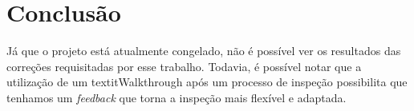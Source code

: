 \chapter{Conclusão}

Já que o projeto está atualmente congelado, não é possível ver os resultados das
correções requisitadas por esse trabalho. Todavia, é possível notar que a utilização
de um textit{Walkthrough} após um processo de inspeção possibilita que tenhamos um \textit{feedback}
que torna a inspeção mais flexível e adaptada.
